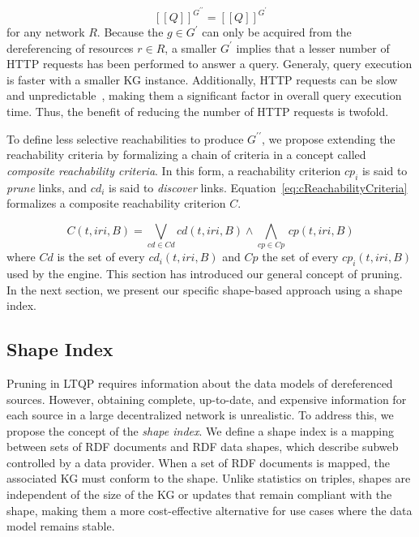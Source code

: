 \begin{equation}\label{eq:evalQueryStructuralAssumption}
   [\![ Q ]\!]^{G^{\prime\prime}} = [\![ Q ]\!]^{G^{\prime}}
\end{equation}
for any network $R$.
Because the $g \in G^{\prime}$ can only be acquired from the dereferencing of resources $r \in R$, a smaller $G^\prime$ implies that a lesser number of HTTP requests has been performed to answer a query.
Generaly, query execution is faster with a smaller KG instance.
Additionally, HTTP requests can be slow and unpredictable~\cite{hartig2016walking}, making them a significant factor in overall query execution time. 
Thus, the benefit of reducing the number of HTTP requests is twofold.

To define less selective reachabilities to produce $G^{\prime\prime}$, we propose extending the reachability criteria by formalizing a chain of criteria in a concept called \emph{composite reachability criteria}.
In this form, a reachability criterion $cp_i$ is said to \emph{prune} links, and $cd_i$ is said to \emph{discover} links.
Equation~\ref{eq:cReachabilityCriteria} formalizes a composite reachability criterion $C$.

\begin{equation}\label{eq:cReachabilityCriteria}
   C(t, iri, B) = \bigvee_{cd \in Cd} cd(t, iri, B) \mathrel{\land} \bigwedge_{cp \in Cp} \, cp(t, iri, B)
\end{equation}
where $Cd$ is the set of every $cd_i(t, iri, B)$ and $Cp$ the set of every $cp_i(t, iri, B)$ used by the engine.
This section has introduced our general concept of pruning. 
In the next section, we present our specific shape-based approach using a shape index.

\subsection{Shape Index}

Pruning in LTQP requires information about the data models of dereferenced sources.
However, obtaining complete, up-to-date, and expensive information for each source in a large decentralized network is unrealistic.
To address this, we propose the concept of the \emph{shape index}. 
We define a shape index is a mapping between sets of RDF documents and RDF data shapes, which describe subweb controlled by a data provider.
When a set of RDF documents is mapped, the associated KG must conform to the shape.
Unlike statistics on triples, shapes are independent of the size of the KG or updates that remain compliant with the shape, making them a more cost-effective alternative for use cases where the data model remains stable. 


